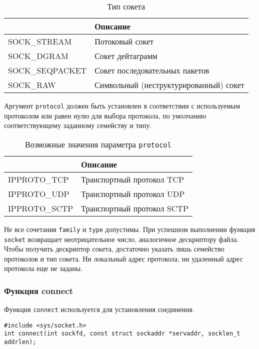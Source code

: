 \begin{table}[h!]
  \caption{Тип сокета}
  \begin{center}
    \begin{tabular}{p{3.5cm}l}
      \toprule
      & \textbf{Описание} \\
      \midrule
      SOCK\_STREAM & Потоковый сокет \\
      SOCK\_DGRAM & Сокет дейтаграмм \\
      SOCK\_SEQPACKET & Сокет последовательных пакетов \\
      SOCK\_RAW & Символьный (неструктурированный) сокет \\
      \bottomrule
    \end{tabular}
  \end{center}
\end{table}

 Аргумент \lstinline{protocol} должен быть установлен в соответствии с используемым протоколом или равен нулю для выбора протокола, по умолчанию соответствующему заданному семейству и типу.
\begin{table}[h!]
  \caption{Возможные значения параметра \lstinline{protocol}}
  \begin{center}
    \begin{tabular}{p{3cm}l}
      \toprule
      & \textbf{Описание} \\
      \midrule
      IPPROTO\_TCP & Транспортный протокол TCP \\
      IPPROTO\_UDP & Транспортный протокол UDP \\
      IPPROTO\_SCTP & Транспортный протокол SCTP \\
      \bottomrule
    \end{tabular}
  \end{center}
\end{table}

Не все сочетания \lstinline{family} и \lstinline{type} допустимы. При успешном выполнении функция \lstinline{socket} возвращает неотрицательное число, аналогичное дескриптору файла. Чтобы получить дескриптор сокета, достаточно указать лишь семейство протоколов и тип сокета. Ни локальный адрес протокола, ни удаленный адрес протокола еще не заданы.

\subsubsection{Функция connect}
Функция \lstinline{connect} используется для установления соединения.
\lstset{language=C,caption=}
\begin{lstlisting}
#include <sys/socket.h>
int connect(int sockfd, const struct sockaddr *servaddr, socklen_t addrlen);
\end{lstlisting}

